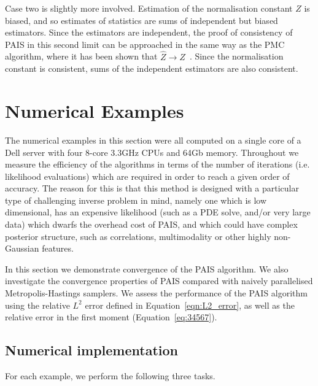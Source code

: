 \documentclass[final]{siamltex}
\begin{document}
Case two is slightly more involved. Estimation of the normalisation constant $Z$ is biased, and so estimates of statistics are sums of independent but biased estimators. Since the estimators are independent, the proof of consistency of PAIS in this second limit can be approached in the same way as the PMC algorithm, where it has been shown that $\hat{Z}\rightarrow Z$~\cite{robert2013monte}. Since the normalisation constant is consistent, sums of the independent estimators are also consistent.


\section{Numerical Examples}\label{Sec:Num}
The numerical examples in this section were all computed on a single
core of a Dell
server with four 8-core 3.3GHz CPUs and 64Gb memory. Throughout we
measure the efficiency of the algorithms in terms of the number of
iterations (i.e. likelihood evaluations) which are required in order
to reach a given order of accuracy. The reason for this is that this
method is designed with a particular type of challenging inverse
problem in mind, namely one which is low dimensional, has an expensive
likelihood (such as a PDE solve, and/or very large data) which dwarfs
the overhead cost of PAIS, and which could have complex posterior
structure, such as correlations, multimodality or other highly
non-Gaussian features. 

In this section we demonstrate convergence of the PAIS algorithm. We
also investigate the convergence properties of PAIS compared with
naively parallelised Metropolis-Hastings samplers. We assess the
performance of the PAIS algorithm using the relative $L^2$ error
defined in Equation~\eqref{eqn:L2_error}, as well as the relative error in the
first moment (Equation~\eqref{eq:34567}).


\subsection{Numerical implementation}
\label{sec:Implementation P1}

For each example, we perform the following three tasks.
\end{document}
